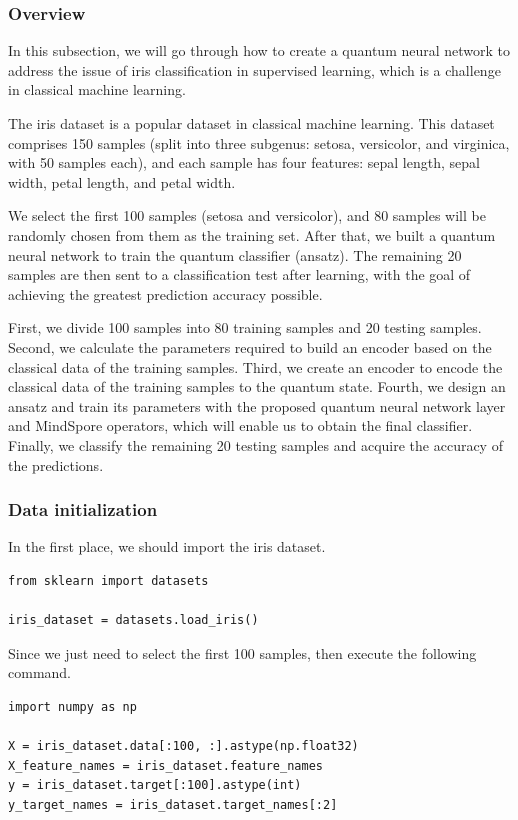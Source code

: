 \subsubsection{Overview}
In this subsection, we will go through how to create a quantum neural network to address the issue of iris classification in supervised learning, which is a challenge in classical machine learning.

The iris dataset is a popular dataset in classical machine learning. This dataset comprises 150 samples (split into three subgenus: setosa, versicolor, and virginica, with 50 samples each), and each sample has four features: sepal length, sepal width, petal length, and petal width.

We select the first 100 samples (setosa and versicolor), and 80 samples will be randomly chosen from them as the training set. After that, we built a quantum neural network to train the quantum classifier (ansatz). The remaining 20 samples are then sent to a classification test after learning, with the goal of achieving the greatest prediction accuracy possible.

First, we divide 100 samples into 80 training samples and 20 testing samples. Second, we calculate the parameters required to build an encoder based on the classical data of the training samples. Third, we create an encoder to encode the classical data of the training samples to the quantum state. Fourth, we design an ansatz and train its parameters with the proposed quantum neural network layer and MindSpore operators, which  will enable us to obtain the final classifier. Finally, we classify the remaining 20 testing samples and acquire the accuracy of the predictions.

\subsubsection{Data initialization}
In the first place, we should import the iris dataset.

\begin{lstlisting}       
from sklearn import datasets                             

iris_dataset = datasets.load_iris()
\end{lstlisting}

Since we just need to select the first 100 samples, then execute the following command.

\begin{lstlisting}
import numpy as np     

X = iris_dataset.data[:100, :].astype(np.float32)
X_feature_names = iris_dataset.feature_names
y = iris_dataset.target[:100].astype(int)
y_target_names = iris_dataset.target_names[:2] 
\end{lstlisting}

